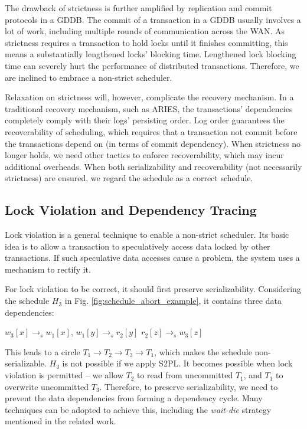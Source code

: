 \documentclass[conference]{IEEEtran}
\begin{document}
The drawback of strictness is further amplified by replication and commit protocols in a GDDB.
The commit of a transaction in a GDDB usually involves a lot of work, including multiple rounds of communication across the WAN.
As strictness requires a transaction to hold locks until it finishes committing, this means a substantially lengthened locks' blocking time.
Lengthened lock blocking time can severely hurt the performance of distributed transactions.
Therefore, we are inclined to embrace a non-strict scheduler.

Relaxation on strictness will, however, complicate the recovery mechanism.
In a traditional recovery mechanism, such as ARIES, the transactions' dependencies completely comply with their logs' persisting order.
Log order guarantees the recoverability of scheduling, which requires that a transaction not commit before the transactions depend on (in terms of commit dependency).
When strictness no longer holds, we need other tactics to enforce recoverability, which may incur additional overheads.
When both serializability and recoverability (not necessarily strictness) are ensured, we regard the schedule as a correct schedule.


\subsection{Lock Violation and Dependency Tracing}

Lock violation is a general technique to enable a non-strict scheduler.
Its basic idea is to allow a transaction to speculatively access data locked by other transactions.
If such speculative data accesses cause a problem, the system uses a mechanism to rectify it.

For lock violation to be correct, it should first preserve serializability.
Considering the schedule ${H_3}$ in Fig. \ref{fig:schedule_abort_example},
it contains three data dependencies:

\begin{center}
${w_3[x] \rightarrow _s w_1[x]}$,
${w_1[y] \rightarrow _s r_2[y]}$
${r_2[z] \rightarrow _s w_3[z]}$
\end{center}

This leads to a circle ${T_1 \rightarrow T_2 \rightarrow T_3 \rightarrow T_1}$, which makes the schedule non-serializable.
${H_3}$ is not possible if we apply S2PL.
It becomes possible when lock violation is permitted -- we allow ${T_2}$ to read from uncommitted ${T_1}$, and ${T_1}$ to overwrite uncommitted ${T_3}$.
Therefore, to preserve serializability, we need to prevent the data dependencies from forming a dependency cycle.
Many techniques can be adopted to achieve this, including the \emph{wait-die} strategy mentioned in the related work.
\end{document}
